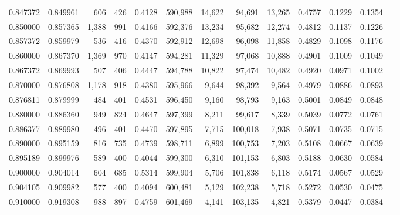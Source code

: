 \begin{tabular}{rrrrrrrrrrrrr}
0.847372 & 0.849961 &    606 &   426 &                                     0.4128 & 590,988 &  14,622 &  94,691 &  13,265 & 0.4757 & 0.1229 & 0.1354 \\
0.850000 & 0.857365 &  1,388 &   991 &                                     0.4166 & 592,376 &  13,234 &  95,682 &  12,274 & 0.4812 & 0.1137 & 0.1226 \\
0.857372 & 0.859979 &    536 &   416 &                                     0.4370 & 592,912 &  12,698 &  96,098 &  11,858 & 0.4829 & 0.1098 & 0.1176 \\
0.860000 & 0.867370 &  1,369 &   970 &                                     0.4147 & 594,281 &  11,329 &  97,068 &  10,888 & 0.4901 & 0.1009 & 0.1049 \\
0.867372 & 0.869993 &    507 &   406 &                                     0.4447 & 594,788 &  10,822 &  97,474 &  10,482 & 0.4920 & 0.0971 & 0.1002 \\
0.870000 & 0.876808 &  1,178 &   918 &                                     0.4380 & 595,966 &   9,644 &  98,392 &   9,564 & 0.4979 & 0.0886 & 0.0893 \\
0.876811 & 0.879999 &    484 &   401 &                                     0.4531 & 596,450 &   9,160 &  98,793 &   9,163 & 0.5001 & 0.0849 & 0.0848 \\
0.880000 & 0.886360 &    949 &   824 &                                     0.4647 & 597,399 &   8,211 &  99,617 &   8,339 & 0.5039 & 0.0772 & 0.0761 \\
0.886377 & 0.889980 &    496 &   401 &                                     0.4470 & 597,895 &   7,715 & 100,018 &   7,938 & 0.5071 & 0.0735 & 0.0715 \\
0.890000 & 0.895159 &    816 &   735 &                                     0.4739 & 598,711 &   6,899 & 100,753 &   7,203 & 0.5108 & 0.0667 & 0.0639 \\
0.895189 & 0.899976 &    589 &   400 &                                     0.4044 & 599,300 &   6,310 & 101,153 &   6,803 & 0.5188 & 0.0630 & 0.0584 \\
0.900000 & 0.904014 &    604 &   685 &                                     0.5314 & 599,904 &   5,706 & 101,838 &   6,118 & 0.5174 & 0.0567 & 0.0529 \\
0.904105 & 0.909982 &    577 &   400 &                                     0.4094 & 600,481 &   5,129 & 102,238 &   5,718 & 0.5272 & 0.0530 & 0.0475 \\
0.910000 & 0.919308 &    988 &   897 &                                     0.4759 & 601,469 &   4,141 & 103,135 &   4,821 & 0.5379 & 0.0447 & 0.0384 \\

\end{tabular}
